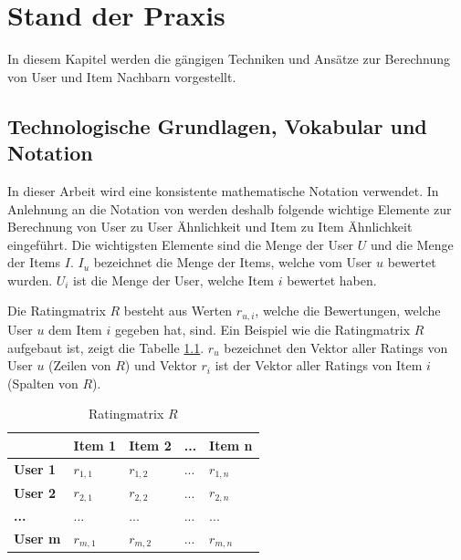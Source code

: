 \chapter{Stand der Praxis}
\label{ch:StandDerPraxis}


In diesem Kapitel werden die gängigen Techniken und Ansätze zur Berechnung von User und Item Nachbarn vorgestellt.

\section{Technologische Grundlagen, Vokabular und Notation}
In dieser Arbeit wird eine konsistente mathematische Notation verwendet. In Anlehnung an die Notation von \cite{Ekstrand2011} werden deshalb folgende wichtige Elemente zur Berechnung von User zu User Ähnlichkeit und Item zu Item Ähnlichkeit eingeführt. Die wichtigsten Elemente sind die Menge der User $U$ und die Menge der Items $I$. $I_u$ bezeichnet die Menge der Items, welche vom User $u$ bewertet wurden. $U_i$ ist die Menge der User, welche Item $i$ bewertet haben.

Die Ratingmatrix $R$ besteht aus Werten $r_{u,i}$, welche die Bewertungen, welche User $u$ dem Item $i$ gegeben hat, sind. Ein Beispiel wie die Ratingmatrix $R$ aufgebaut ist, zeigt die Tabelle \ref{Ratingmatrix}.
$r_u$ bezeichnet den Vektor aller Ratings von User $u$ (Zeilen von $R$) und Vektor $r_i$ ist der Vektor aller Ratings von Item $i$ (Spalten von $R$).

\begin{table}[htb]
    \caption{Ratingmatrix $R$}
    \label{Ratingmatrix}
    \begin{tabularx}{\textwidth}{|X|X|X|X|X|}
    	\hline 
    	\textbf{} & \textbf{Item 1} & \textbf{Item 2} & \textbf{...}& \textbf{Item n} \\
    	\hline 
    	\textbf{User 1}& $r_{1,1}$ & $r_{1,2}$ & ... & $r_{1,n}$\\ 
    	\hline 
    	\textbf{User 2} &  $r_{2,1}$ & $r_{2,2}$ & ... & $r_{2,n}$\\ 
    	\hline
    	\textbf{...}& ... & ... & ... & ...\\
    	\hline
    	\textbf{User m} &  $r_{m,1}$ & $r_{m,2}$ & ... & $r_{m,n}$\\
    	\hline
    \end{tabularx}
\end{table}


